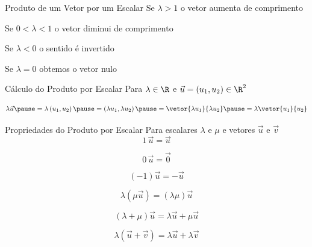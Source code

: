 \documentclass[fleqn,utf8,aspectratio=169,12pt]{beamer}
\begin{document}
\begin{frame}{Produto de um Vetor por um Escalar}
  \pause
  Se \; $\lambda>1$   \tabto{30mm} o vetor aumenta de comprimento

  \pause
  \smallskip
  Se \; $0<\lambda<1$ \tabto{30mm} o vetor diminui de comprimento

  \pause
  \smallskip
  Se \; $\lambda<0$   \tabto{30mm} o sentido é invertido

  \pause
  \smallskip
  Se \; $\lambda=0$   \tabto{30mm} obtemos o vetor nulo
\end{frame}


\begin{frame}{Cálculo do Produto por Escalar}
  Para
  \(
    \lambda \in \R
  \)
  \pause
  e
  \(
    \vec{u}
    = ( u_1, u_2 )
    \in \R^2
  \)

  \pause
  \[
    \lambda\vec{u}
    \pause
    = \lambda \left( u_1, u_2 \right)
    \pause
    = \left( \lambda u_1, \lambda u_2 \right)
    \pause
    = \vetor{\lambda u_1}{\lambda u_2}
    \pause
    = \lambda \vetor{u_1}{u_2}
  \]
\end{frame}



\begin{frame}{Propriedades do Produto por Escalar}
  Para escalares $\lambda$ e $\mu$ e vetores $\vec{u}$ e $\vec{v}$
  \pause
  \[
    1 \, \vec{u} = \vec{u}
  \]

  \pause
  \[
    0 \, \vec{u} = \vec{0}
  \]

  \pause
  \[
    (-1)\vec{u} = -\vec{u}
  \]

  \pause
  \[
    \lambda(\mu\vec{u}) = (\lambda\mu)\vec{u}
  \]

  \pause
  \[
    (\lambda+\mu)\vec{u} = \lambda\vec{u}+\mu\vec{u}
  \]

  \pause
  \[
    \lambda(\vec{u}+\vec{v}) = \lambda\vec{u}+\lambda\vec{v}
  \]
\end{frame}
\end{document}
